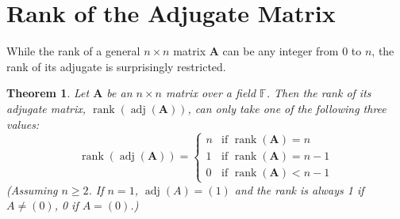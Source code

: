 \documentclass[11pt]{article}
\newtheorem{theorem}{Theorem}[section]
\theoremstyle{definition}
\theoremstyle{remark}
\newcommand{\field}[1]{\mathbb{#1}} %
\newcommand{\F}{\field{F}} %
\DeclareMathOperator{\rank}{rank}
\DeclareMathOperator{\adj}{adj}
\newcommand{\mat}[1]{\mathbf{#1}} %
\begin{document}
\section{Rank of the Adjugate Matrix}

While the rank of a general $n \times n$ matrix $\mat{A}$ can be any integer from 0 to $n$, the rank of its adjugate is surprisingly restricted.

\begin{theorem} \label{thm:rank_adj}
Let $\mat{A}$ be an $n \times n$ matrix over a field $\F$. Then the rank of its adjugate matrix, $\rank(\adj(\mat{A}))$, can only take one of the following three values:
\[ \rank(\adj(\mat{A})) = \begin{cases} n & \text{if } \rank(\mat{A}) = n \\ 1 & \text{if } \rank(\mat{A}) = n-1 \\ 0 & \text{if } \rank(\mat{A}) < n-1 \end{cases} \]
(Assuming $n \ge 2$. If $n=1$, $\adj(A)=(1)$ and the rank is always 1 if $A \neq (0)$, 0 if $A=(0)$.)
\end{theorem}
\end{document}
